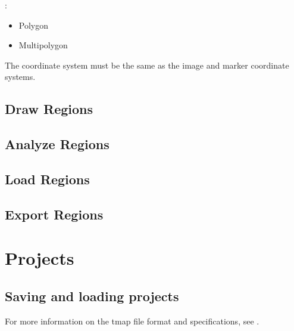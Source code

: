 \documentclass[letterpaper,10pt,english,openany,oneside]{sphinxmanual}
\begin{document}
\sphinxAtStartPar
{}:
\begin{itemize}
\item {} 
\sphinxAtStartPar
Polygon

\item {} 
\sphinxAtStartPar
Multipolygon

\end{itemize}

\sphinxAtStartPar
The coordinate system must be the same as the image and marker coordinate systems.


\subsection{Draw Regions}
\label{\detokenize{docs/starting/regions:draw-regions}}

\subsection{Analyze Regions}
\label{\detokenize{docs/starting/regions:analyze-regions}}

\subsection{Load Regions}
\label{\detokenize{docs/starting/regions:load-regions}}

\subsection{Export Regions}
\label{\detokenize{docs/starting/regions:export-regions}}
\sphinxstepscope


\section{Projects}
\label{\detokenize{docs/starting/projects:projects}}\label{\detokenize{docs/starting/projects::doc}}

\subsection{Saving and loading projects}
\label{\detokenize{docs/starting/projects:saving-and-loading-projects}}


\sphinxAtStartPar
For more information on the tmap file format and specifications, see {\hyperref[\detokenize{docs/advanced/tmap:the-tmap-file-format}]{}}.
\end{document}
